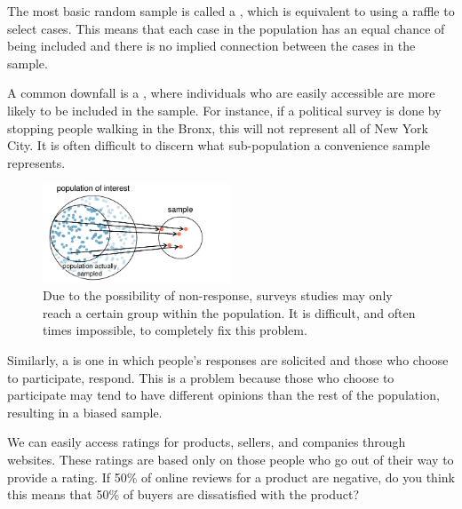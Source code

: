 The most basic random sample is called a , which is equivalent to using a raffle to select cases. This means that each case in the population has an equal chance of being included and there is no implied connection between the cases in the sample.

A common downfall is a , where individuals who are easily accessible are more likely to be included in the sample. For instance, if a political survey is done by stopping people walking in the Bronx, this will not represent all of New York City. It is often difficult to discern what sub-population a convenience sample represents.

\begin{figure}[h]
\centering
\includegraphics[width=0.5\textwidth]{ch_data_collection/figures/popToSample/surveySample}
\caption{Due to the possibility of non-response, surveys studies may only reach a certain group within the population. It is difficult, and often times impossible, to completely fix this problem.}
\label{surveySample}
\end{figure}

Similarly, a  is one in which people's responses are solicited and those who choose to participate, respond. This is a problem because those who choose to participate may tend to have different opinions than the rest of the population, resulting in a biased sample.

\begin{exercisewrap}
\begin{nexercise}
We can easily access ratings for products, sellers, and companies through websites. These ratings are based only on those people who go out of their way to provide a rating. If 50\% of online reviews for a product are negative, do you think this means that 50\% of buyers are dissatisfied with the product?\footnotemark
\end{nexercise}
\end{exercisewrap}

